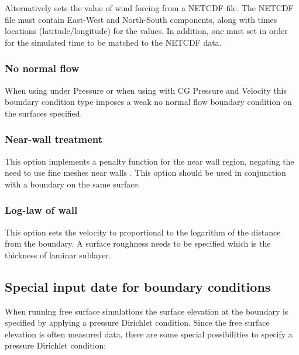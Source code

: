 Alternatively
sets the value of wind forcing from a NETCDF file. The NETCDF file must
contain East-West and North-South components, along with times locations
(latitude/longitude) for the values. In addition, one must set
 in order for the simulated
time to be matched to the NETCDF data.

\subsubsection{No normal flow}

When using  under Pressure  or when using 
 with CG Pressure and Velocity this boundary condition type 
imposes a weak no normal flow boundary condition on the surfaces specified.

\subsubsection{Near-wall treatment}

This option implements a penalty function for the near wall region, negating the need to use fine meshes
near walls \citep{bazilevs2007}. This option should be used in conjunction with a 
 boundary on the same surface.

\subsubsection{Log-law of wall}

This option sets the velocity to proportional to the logarithm of the distance from the boundary. 
A surface roughness needs to be specified which is the thickness of laminar sublayer.

\subsection{Special input date for boundary conditions}\label{sec:BCs:specialised}

When running free surface simulations the surface elevation at the boundary is specified by applying a pressure Dirichlet condition. Since the free surface elevation is often measured data, there are some special possibilities to specify a pressure Dirichlet condition: 

